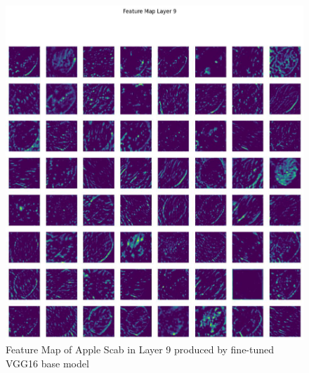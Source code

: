 \begin{figure}
    \centering
    \includegraphics[width=\linewidth]{graphics//chapter7/abr feature map layer 9.png}
    \caption{Feature Map of Apple Scab in Layer 9 produced by fine-tuned VGG16 base model}
    \label{fig:abr-fmap3}
\end{figure}

